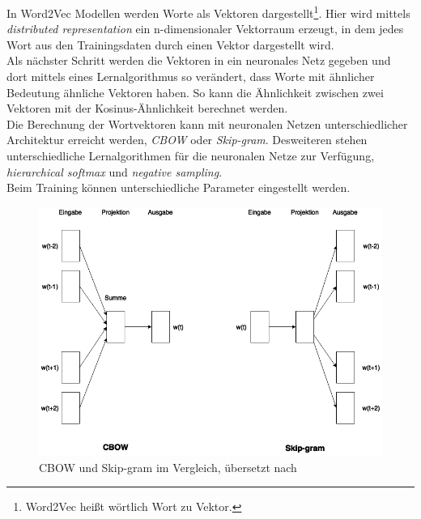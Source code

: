 \documentclass[12pt,a4paper]{report}
\begin{document}
In Word2Vec Modellen werden Worte als Vektoren dargestellt\footnote{Word2Vec heißt wörtlich Wort zu Vektor.}. Hier wird mittels \textit{distributed representation}\cite{DBLP:journals/corr/abs-1301-3781} ein n-dimensionaler Vektorraum erzeugt, in dem jedes Wort aus den Trainingsdaten durch einen Vektor dargestellt wird.\\
Als nächster Schritt werden die Vektoren in ein neuronales Netz gegeben und dort mittels eines Lernalgorithmus so verändert, dass Worte mit ähnlicher Bedeutung ähnliche Vektoren haben. So kann die Ähnlichkeit zwischen zwei Vektoren mit der Kosinus-Ähnlichkeit berechnet werden.\\
Die Berechnung der Wortvektoren kann mit neuronalen Netzen unterschiedlicher Architektur erreicht werden, \textit{CBOW} oder \textit{Skip-gram}. Desweiteren stehen unterschiedliche Lernalgorithmen für die neuronalen Netze zur Verfügung, \textit{hierarchical softmax}  und \textit{negative sampling}.\\
Beim Training können unterschiedliche Parameter eingestellt werden.\\



\begin{figure}[h]
  \begin{center}
	\includegraphics[scale=0.55]{CBOWvsSkip-gram.png}
  \end{center}  
  \caption{CBOW und Skip-gram im Vergleich, übersetzt nach \cite{DBLP:journals/corr/abs-1301-3781}}
  \label{cbowvsskipgram}
\end{figure}
\end{document}
